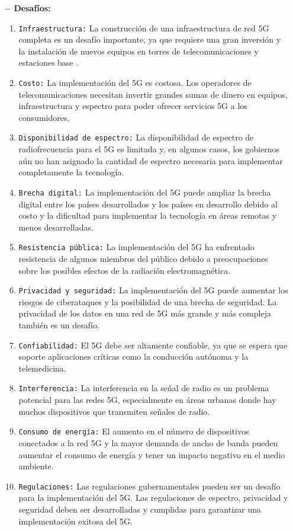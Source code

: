 \documentclass[12pt]{article}
\begin{document}
            \begin{itemize}
                \item [$-$] \textbf{Desafíos:}

                    \begin{enumerate}
                        \item  {\tt Infraestructura:} La construcción de una infraestructura de red 5G completa es un desafío importante, ya que requiere una gran inversión y la instalación de nuevos equipos en torres de telecomunicaciones y estaciones base .
                        \item  {\tt Costo:} La implementación del 5G es costosa. Los operadores de telecomunicaciones necesitan invertir grandes sumas de dinero en equipos, infraestructura y espectro para poder ofrecer servicios 5G a los consumidores.
                        \item  {\tt Disponibilidad de espectro:} La disponibilidad de espectro de radiofrecuencia para el 5G es limitada y, en algunos casos, los gobiernos aún no han asignado la cantidad de espectro necesaria para implementar completamente la tecnología.
                        \item  {\tt Brecha digital:} La implementación del 5G puede ampliar la brecha digital entre los países desarrollados y los países en desarrollo debido al costo y la dificultad para implementar la tecnología en áreas remotas y menos desarrolladas.
                        \item {\tt Resistencia pública:}  La implementación del 5G ha enfrentado resistencia de algunos miembros del público debido a preocupaciones sobre los posibles efectos de la radiación electromagnética.
                        \item {\tt Privacidad y seguridad:} La implementación del 5G puede aumentar los riesgos de ciberataques y la posibilidad de una brecha de seguridad. La privacidad de los datos en una red de 5G más grande y más compleja también es un desafío.
                        \item {\tt Confiabilidad:} El 5G debe ser altamente confiable, ya que se espera que soporte aplicaciones críticas como la conducción autónoma y la telemedicina.
                        \item {\tt Interferencia:}  La interferencia en la señal de radio es un problema potencial para las redes 5G, especialmente en áreas urbanas donde hay muchos dispositivos que transmiten señales de radio.
                        \item {\tt Consumo de energía:}  El aumento en el número de dispositivos conectados a la red 5G y la mayor demanda de ancho de banda pueden aumentar el consumo de energía y tener un impacto negativo en el medio ambiente.
                        \item {\tt Regulaciones:}   Las regulaciones gubernamentales pueden ser un desafío para la implementación del 5G. Las regulaciones de espectro, privacidad y seguridad deben ser desarrolladas y cumplidas para garantizar una implementación exitosa del 5G.
                        

\end{enumerate}
\end{itemize}
\end{document}
